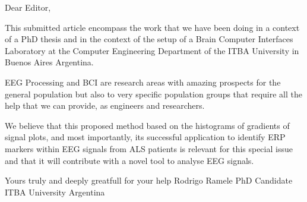 Dear Editor, 

This submitted article encompass the work that we have been doing in a context of a PhD thesis and in the context of the setup of a Brain Computer Interfaces Laboratory at the Computer Engineering Department of the ITBA University in Buenos Aires Argentina.

EEG Processing and BCI are research areas with amazing prospects for the general population but also to very specific population groups that require all the help that we can provide, as engineers and researchers.

We believe that this proposed method based on the histograms of gradients of signal plots, and most importantly, its successful application to identify ERP markers within EEG signals from ALS patients is relevant for this special issue and that it will contribute with a novel tool to analyse EEG signals.

Yours truly and deeply greatfull for your help
Rodrigo Ramele
PhD Candidate
ITBA University 
Argentina